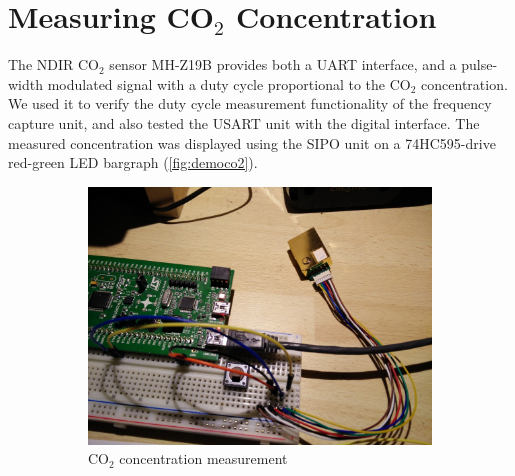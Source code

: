 \section{Measuring \texorpdfstring{CO$_2$}{CO2} Concentration}

The \gls{NDIR} CO$_2$ sensor MH-Z19B provides both a \gls{UART} interface, and a pulse-width modulated signal with a duty cycle proportional to the CO$_2$ concentration. 
We used it to verify the duty cycle measurement functionality of the frequency capture unit, and also tested the \gls{USART} unit with the digital interface. The measured concentration was displayed using the SIPO unit on a 74HC595-drive red-green LED bargraph (\cref{fig:democo2}).

\begin{figure}[H]
	\centering
	\begin{subfigure}{.72\textwidth}
		\includegraphics[width=.98\textwidth]{img/ph-co2.jpg}
		\caption{CO$_2$ concentration measurement}
	\end{subfigure}%
	\begin{subfigure}{.28\textwidth}

\end{subfigure}
\end{figure}
